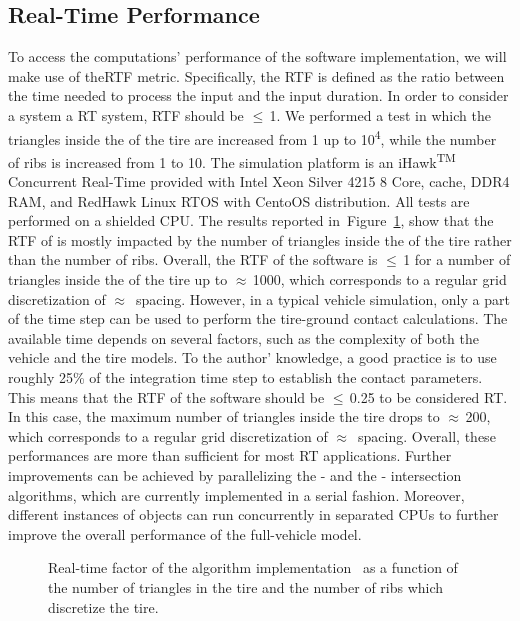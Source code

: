 \subsection{Real-Time Performance}
\label{app2:sec:performance}

To access the computations' performance of the \Enve{} \cpp{} software implementation, we will make use of the\ac{RTF} metric. Specifically, the \ac{RTF} is defined as the ratio between the time needed to process the input and the input duration. In order to consider a system a \ac{RT} system, \ac{RTF} should be $\leq$\,1. We performed a test in which the triangles inside the \Aabb{} of the tire are increased from 1 up to 10\textsuperscript{4}, while the number of ribs is increased from 1 to 10. The simulation platform is an iHawk\textsuperscript{TM} Concurrent Real-Time provided with  Intel Xeon Silver 4215 8 Core,  cache,  DDR4 \ac{RAM}, and  RedHawk Linux RTOS with CentoOS distribution. All tests are performed on a shielded CPU. The results reported in~Figure~\ref{app2:fig:rtf_enve}, show that the \ac{RTF} of \Enve{} is mostly impacted by the number of triangles inside the \Aabb{} of the tire rather than the number of ribs. Overall, the \ac{RTF} of the software is $\leq$\,1 for a number of triangles inside the \Aabb{} of the tire up to $\approx$\,1000, which corresponds to a regular grid discretization of $\approx$\, spacing. However, in a typical vehicle simulation, only a part of the time step can be used to perform the tire-ground contact calculations. The available time depends on several factors, such as the complexity of both the vehicle and the tire models. To the author' knowledge, a good practice is to use roughly 25\% of the integration time step to establish the contact parameters. This means that the \ac{RTF} of the software should be $\leq$\,0.25 to be considered \ac{RT}. In this case, the maximum number of triangles inside the tire \Aabb{} drops to $\approx$\,200, which corresponds to a regular grid discretization of $\approx$\, spacing. Overall, these performances are more than sufficient for most \ac{RT} applications. Further improvements can be achieved by parallelizing the \AabbTree{}-\Aabb{} and the \Rib{}-\TriangleGround{} intersection algorithms, which are currently implemented in a serial fashion. Moreover, different instances of \Enve{} objects can run concurrently in separated CPUs to further improve the overall performance of the full-vehicle model.

\begin{figure}[htb]
  \centering
  \small{}
  \caption{Real-time factor of the \Enve{} algorithm \cpp{} implementation~\cite{enve} as a function of the number of triangles in the tire \Aabb{} and the number of ribs which discretize the tire.}
  \label{app2:fig:rtf_enve}
\end{figure}

